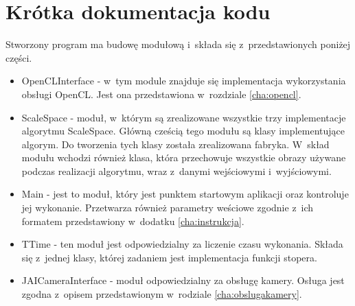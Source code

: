 \chapter{Krótka dokumentacja kodu}
\label{cha:dokumentacja}

Stworzony program ma budowę modułową i~składa się z~przedstawionych poniżej części.

\begin{itemize}
\item OpenCLInterface - w~tym module znajduje się implementacja wykorzystania obsługi OpenCL. Jest ona przedstawiona w~rozdziale \ref{cha:opencl}.
\item ScaleSpace - moduł, w~którym są zrealizowane wszystkie trzy implementacje algorytmu ScaleSpace. Główną cześcią tego modułu są klasy implementujące algorym. Do tworzenia tych klasy została zrealizowana fabryka. W~skład modułu wchodzi również klasa, która przechowuje wszystkie obrazy używane podczas realizacji algorytmu, wraz z~danymi wejściowymi i~wyjściowymi.
\item Main - jest to moduł, który jest punktem startowym aplikacji oraz kontroluje jej wykonanie. Przetwarza również parametry weściowe zgodnie z~ich formatem przedstawiony w~dodatku \ref{cha:instrukcja}.
\item TTime - ten moduł jest odpowiedzialny za liczenie czasu wykonania. Składa się z~jednej klasy, której zadaniem jest implementacja funkcji stopera.
\item JAICameraInterface - moduł odpowiedzialny za obsługę kamery. Osługa jest zgodna z~opisem przedstawionym w~rodziale \ref{cha:obslugakamery}.
\end{itemize}
